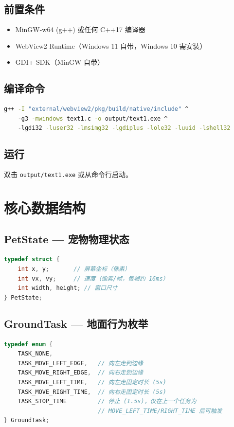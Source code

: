 \documentclass[12pt,a4paper]{ctexart}
\begin{document}
\subsection{前置条件}
\begin{itemize}
    \item MinGW-w64 (g++) 或任何 C++17 编译器
    \item WebView2 Runtime（Windows 11 自带，Windows 10 需安装）
    \item GDI+ SDK（MinGW 自带）
\end{itemize}

\subsection{编译命令}
\begin{lstlisting}[language=bash,numbers=none]
g++ -I "external/webview2/pkg/build/native/include" ^
    -g3 -mwindows text1.c -o output/text1.exe ^
    -lgdi32 -luser32 -lmsimg32 -lgdiplus -lole32 -luuid -lshell32
\end{lstlisting}

\subsection{运行}
双击 \texttt{output/text1.exe} 或从命令行启动。

\section{核心数据结构}

\subsection{PetState --- 宠物物理状态}
\begin{lstlisting}[language=C++]
typedef struct {
    int x, y;       // 屏幕坐标（像素）
    int vx, vy;     // 速度（像素/帧，每帧约 16ms）
    int width, height; // 窗口尺寸
} PetState;
\end{lstlisting}

\subsection{GroundTask --- 地面行为枚举}
\begin{lstlisting}[language=C++]
typedef enum {
    TASK_NONE,
    TASK_MOVE_LEFT_EDGE,   // 向左走到边缘
    TASK_MOVE_RIGHT_EDGE,  // 向右走到边缘
    TASK_MOVE_LEFT_TIME,   // 向左走固定时长 (5s)
    TASK_MOVE_RIGHT_TIME,  // 向右走固定时长 (5s)
    TASK_STOP_TIME         // 停止 (1.5s)，仅在上一个任务为
                           // MOVE_LEFT_TIME/RIGHT_TIME 后可触发
} GroundTask;
\end{lstlisting}
\end{document}
